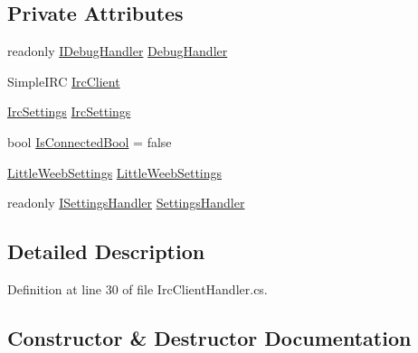 \subsection*{Private Attributes}
\begin{DoxyCompactItemize}
\item 
readonly \mbox{\hyperlink{interface_little_weeb_library_1_1_handlers_1_1_i_debug_handler}{I\+Debug\+Handler}} \mbox{\hyperlink{class_little_weeb_library_1_1_handlers_1_1_irc_client_handler_ab50ece494948d25db1839f4d6eab038f}{Debug\+Handler}}
\item 
Simple\+I\+RC \mbox{\hyperlink{class_little_weeb_library_1_1_handlers_1_1_irc_client_handler_a1c78638ea8025b27bb3e604f432ce325}{Irc\+Client}}
\item 
\mbox{\hyperlink{class_little_weeb_library_1_1_settings_1_1_irc_settings}{Irc\+Settings}} \mbox{\hyperlink{class_little_weeb_library_1_1_handlers_1_1_irc_client_handler_a5a8c1eee913ec3c9afad8acd1bfbc37c}{Irc\+Settings}}
\item 
bool \mbox{\hyperlink{class_little_weeb_library_1_1_handlers_1_1_irc_client_handler_a10457d1436c29ce92878e74579717dc0}{Is\+Connected\+Bool}} = false
\item 
\mbox{\hyperlink{class_little_weeb_library_1_1_settings_1_1_little_weeb_settings}{Little\+Weeb\+Settings}} \mbox{\hyperlink{class_little_weeb_library_1_1_handlers_1_1_irc_client_handler_a03a557318cb10111d7871fb229a86a86}{Little\+Weeb\+Settings}}
\item 
readonly \mbox{\hyperlink{interface_little_weeb_library_1_1_handlers_1_1_i_settings_handler}{I\+Settings\+Handler}} \mbox{\hyperlink{class_little_weeb_library_1_1_handlers_1_1_irc_client_handler_ac52cdf245955073d59f8193e167c149d}{Settings\+Handler}}
\end{DoxyCompactItemize}


\subsection{Detailed Description}


Definition at line 30 of file Irc\+Client\+Handler.\+cs.



\subsection{Constructor \& Destructor Documentation}
\mbox{\label{class_little_weeb_library_1_1_handlers_1_1_irc_client_handler_a01745667c95f2c3d5c461f708aa13bb8}} 
